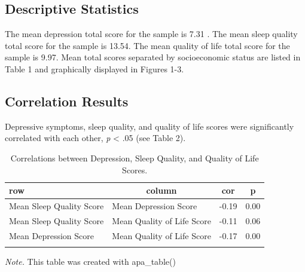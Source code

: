 \documentclass[man]{apa6}
\begin{document}
\subsection{Descriptive Statistics}\label{descriptive-statistics}

The mean depression total score for the sample is 7.31 . The mean sleep
quality total score for the sample is 13.54. The mean quality of life
total score for the sample is 9.97. Mean total scores separated by
socioeconomic status are listed in Table 1 and graphically displayed in
Figures 1-3.

\subsection{Correlation Results}\label{correlation-results}

Depressive symptoms, sleep quality, and quality of life scores were
significantly correlated with each other, \emph{p} \textless{} .05 (see
Table 2).

\begin{table}[tbp]
\begin{center}
\begin{threeparttable}
\caption{\label{tab:correlations table}Correlations between Depression, Sleep Quality, and Quality of Life Scores.}
\begin{tabular}{llll}
\toprule
row & \multicolumn{1}{c}{column} & \multicolumn{1}{c}{cor} & \multicolumn{1}{c}{p}\\
\midrule
Mean Sleep Quality Score & Mean Depression Score & -0.19 & 0.00\\
Mean Sleep Quality Score & Mean Quality of Life Score & -0.11 & 0.06\\
Mean Depression Score & Mean Quality of Life Score & -0.17 & 0.00\\
\bottomrule
\addlinespace
\end{tabular}
\begin{tablenotes}[para]
\normalsize{\textit{Note.} This table was created with apa\_table()}
\end{tablenotes}
\end{threeparttable}
\end{center}
\end{table}
\end{document}
